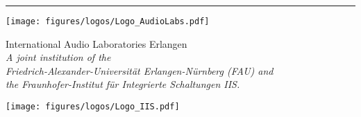 \begin{titlepage}
\begin{localsize}{11}
\noindent\rule{16cm}{1pt}
\vspace{-0.5cm}
\begin{center}
\begin{minipage}[t]{2.6cm}
\vspace{0pt}
	\texttt{[image: figures/logos/Logo\_AudioLabs.pdf]}
\end{minipage}
\hfill
%
\begin{minipage}[t]{8.5cm}
\vspace{0pt}\sffamily{} 
\begin{center}
International Audio Laboratories Erlangen\\
\textit{\footnotesize A joint institution of the \vspace{-0.05cm}\\ 
Friedrich-Alexander-Universität Erlangen-Nürnberg (FAU) and \vspace{-0.15cm}\\
the Fraunhofer-Institut für Integrierte Schaltungen IIS.}
\end{center}
\end{minipage}
%
\hfill
\begin{minipage}[t]{3.3cm}
\vspace{0pt}
	\texttt{[image: figures/logos/Logo\_IIS.pdf]}
\end{minipage}
\end{center}


\end{localsize}
\end{titlepage} 

\restoregeometry
